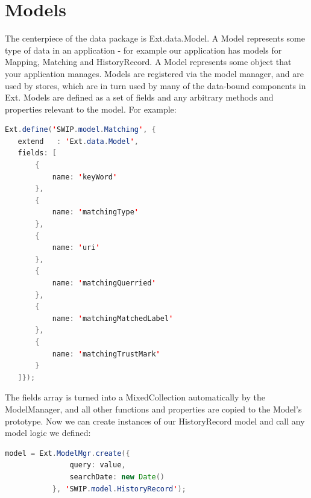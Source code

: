 \section{Models} 
\par The centerpiece of the data package is Ext.data.Model. A Model represents some type of data in an application - for example our application has models for Mapping, Matching and HistoryRecord. A Model represents some object that your application manages. Models are registered via the model manager, and are used by stores, which are in turn used by many of the data-bound components in Ext. Models are defined as a set of fields and any arbitrary methods and properties relevant to the model. For example: \\
\begin{lstlisting}[language=Java]
Ext.define('SWIP.model.Matching', {
   extend   : 'Ext.data.Model',
   fields: [
       {
           name: 'keyWord'
       },  
       {
           name: 'matchingType'
       },
       {
           name: 'uri'
       },
       {
           name: 'matchingQuerried'
       },
       {
           name: 'matchingMatchedLabel'
       },
       {
           name: 'matchingTrustMark'
       } 
   ]});
\end{lstlisting}
\par The fields array is turned into a MixedCollection automatically by the ModelManager, and all other functions and properties are copied to the Model's prototype. Now we can create instances of our HistoryRecord model and call any model logic we defined: \\
\begin{lstlisting}[language=Java]
model = Ext.ModelMgr.create({
               query: value, 
               searchDate: new Date()
           }, 'SWIP.model.HistoryRecord');
\end{lstlisting}

